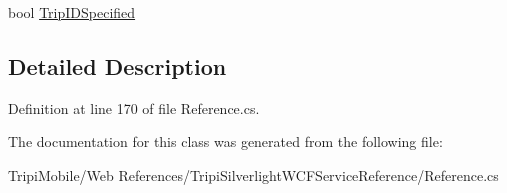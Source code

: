 \begin{DoxyCompactItemize}
\begin{DoxyCompactList}\small\item\em \item\end{DoxyCompactList}\item 
\hypertarget{class_tripi_1_1_tripi_w_c_f_service_1_1_position_node_a696592ca21ebdb02ae24f0f82378ee23}{
bool \hyperlink{class_tripi_1_1_tripi_w_c_f_service_1_1_position_node_a696592ca21ebdb02ae24f0f82378ee23}{TripIDSpecified}}
\label{class_tripi_1_1_tripi_w_c_f_service_1_1_position_node_a696592ca21ebdb02ae24f0f82378ee23}

\begin{DoxyCompactList}\small\item\em \item\end{DoxyCompactList}\end{DoxyCompactItemize}


\subsection{Detailed Description}


Definition at line 170 of file Reference.cs.

The documentation for this class was generated from the following file:\begin{DoxyCompactItemize}
\item 
TripiMobile/Web References/TripiSilverlightWCFServiceReference/Reference.cs\end{DoxyCompactItemize}
